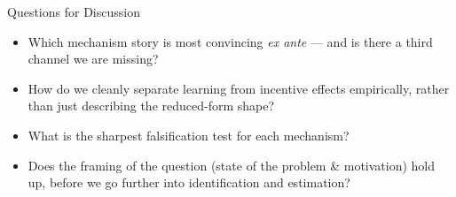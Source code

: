 \documentclass[11pt,aspectratio=169]{beamer}
\begin{document}
\begin{frame}{Questions for Discussion}
\begin{itemize}
    \item Which mechanism story is most convincing \emph{ex ante} --- and
          is there a third channel we are missing?
    \item How do we cleanly separate learning from incentive effects
          empirically, rather than just describing the reduced-form shape?
    \item What is the sharpest falsification test for each mechanism?
    \item Does the framing of the question (state of the problem \&
          motivation) hold up, before we go further into identification
          and estimation?
\end{itemize}
\end{frame}
\end{document}
